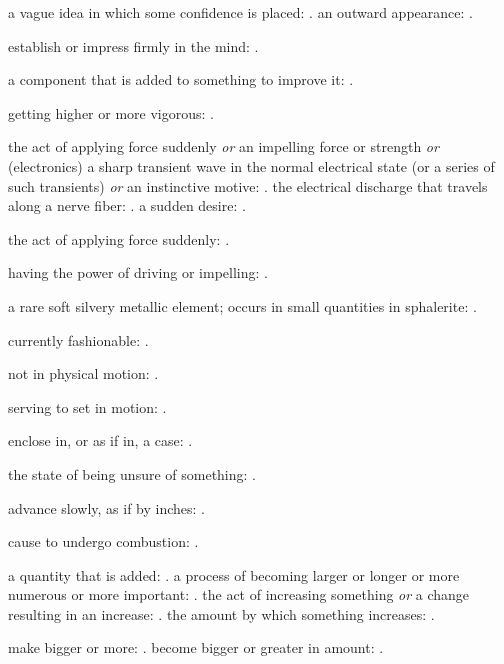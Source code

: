   a vague idea in which some confidence is placed: . an outward appearance: .

  establish or impress firmly in the mind: .

  a component that is added to something to improve it: .

  getting higher or more vigorous: .

  the act of applying force suddenly \textit{or} an impelling force or strength \textit{or} (electronics) a sharp transient wave in the normal electrical state (or a series of such transients) \textit{or} an instinctive motive: . the electrical discharge that travels along a nerve fiber: . a sudden desire: .

  the act of applying force suddenly: .

  having the power of driving or impelling: .

  a rare soft silvery metallic element; occurs in small quantities in sphalerite: .

  currently fashionable: .

  not in physical motion: .

  serving to set in motion: .

  enclose in, or as if in, a case: .

  the state of being unsure of something: .

  advance slowly, as if by inches: .

  cause to undergo combustion: .

  a quantity that is added: . a process of becoming larger or longer or more numerous or more important: . the act of increasing something \textit{or} a change resulting in an increase: . the amount by which something increases: .

  make bigger or more: . become bigger or greater in amount: .

